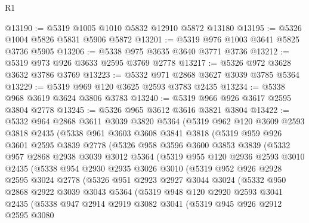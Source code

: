 \begin{lexlean}{R1}
\begin{coremodule}
@13190 := @5319 @1005 @1010 @5832 @12910 @5872 @13180
@13195 := @5326 @1004 @5826 @5831 @5906 @5872
@13201 := @5319 @976 @1003 @3641 @5825 @3736 @5905
@13206 := @5338 @975 @3635 @3640 @3771 @3736
@13212 := @5319 @973 @926 @3633 @2595 @3769 @2778
@13217 := @5326 @972 @3628 @3632 @3786 @3769
@13223 := @5332 @971 @2868 @3627 @3039 @3785 @5364
@13229 := @5319 @969 @120 @3625 @2593 @3783 @2435
@13234 := @5338 @968 @3619 @3624 @3806 @3783
@13240 := @5319 @966 @926 @3617 @2595 @3804 @2778
@13245 := @5326 @965 @3612 @3616 @3821 @3804
@13422 := @5332
    @964
    @2868
    @3611
    @3039
    @3820
    @5364
    (@5319
      @962
      @120
      @3609
      @2593
      @3818
      @2435
      (@5338
        @961
        @3603
        @3608
        @3841
        @3818
        (@5319
          @959
          @926
          @3601
          @2595
          @3839
          @2778
          (@5326
            @958
            @3596
            @3600
            @3853
            @3839
            (@5332
              @957
              @2868
              @2938
              @3039
              @3012
              @5364
              (@5319
                @955
                @120
                @2936
                @2593
                @3010
                @2435
                (@5338
                  @954
                  @2930
                  @2935
                  @3026
                  @3010
                  (@5319
                    @952
                    @926
                    @2928
                    @2595
                    @3024
                    @2778
                    (@5326
                      @951
                      @2923
                      @2927
                      @3044
                      @3024
                      (@5332
                        @950
                        @2868
                        @2922
                        @3039
                        @3043
                        @5364
                        (@5319
                          @948
                          @120
                          @2920
                          @2593
                          @3041
                          @2435
                          (@5338
                            @947
                            @2914
                            @2919
                            @3082
                            @3041
                            (@5319
                              @945
                              @926
                              @2912
                              @2595
                              @3080

\end{coremodule}
\end{lexlean}

